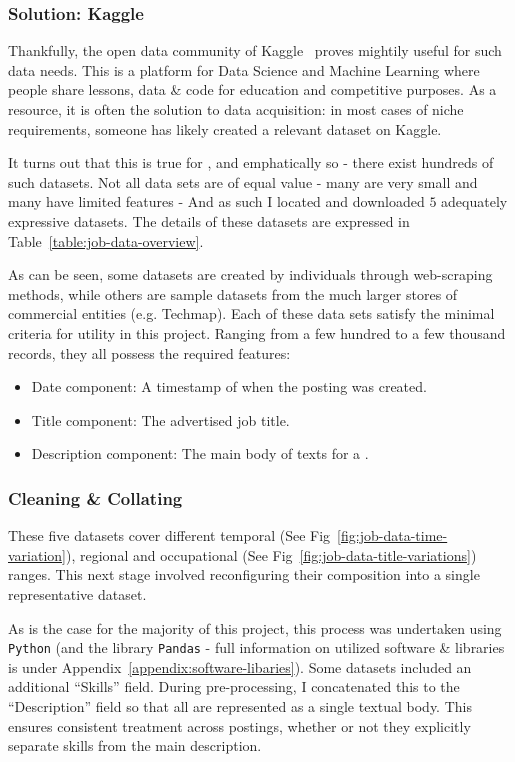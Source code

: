 \subsubsection{Solution: Kaggle}
Thankfully, the open data community of Kaggle~\cite{kaggle_datasets} proves mightily useful for such data needs.
This is a platform for Data Science and Machine Learning where people share lessons, data \& code for education and competitive purposes.
As a resource, it is often the solution to data acquisition: in most cases of niche requirements, someone has likely created a relevant dataset on Kaggle.

It turns out that this is true for \jobposts{}, and emphatically so - there exist hundreds of such datasets.
Not all data sets are of equal value - many are very small and many have limited features - And as such I located and downloaded $5$ adequately expressive datasets.
The details of these datasets are expressed in Table~\ref{table:job-data-overview}.



As can be seen, some datasets are created by individuals through web-scraping methods, while others are sample datasets from the much larger stores of commercial entities (e.g. Techmap\cite{techmap}).
Each of these data sets satisfy the minimal criteria for utility in this project. Ranging from a few hundred to a few thousand records, they all possess the required features:
\begin{itemize}
    \item Date component: A timestamp of when the posting was created.
    \item Title component: The advertised job title.
    \item Description component: The main body of texts for a \jobpost{}.
\end{itemize}

\subsubsection{Cleaning \& Collating}

These five datasets cover different temporal (See Fig~\ref{fig:job-data-time-variation}), regional and occupational (See Fig~\ref{fig:job-data-title-variations}) ranges.
This next stage involved reconfiguring their composition into a single representative dataset.


As is the case for the majority of this project, this process was undertaken using \texttt{Python} (and the library \texttt{Pandas} - full information on utilized software \& libraries is under Appendix~\ref{appendix:software-libaries}).
Some datasets included an additional ``Skills'' field.
During pre-processing, I concatenated this to the ``Description'' field so that all \jobposts{} are represented as a single textual body.
This ensures consistent treatment across postings, whether or not they explicitly separate skills from the main description.

